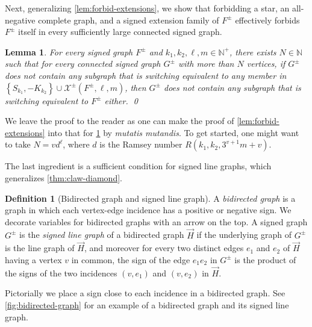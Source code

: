 \documentclass[11pt]{article}
\newtheorem{lemma}[theorem]{Lemma}
\theoremstyle{definition}
\newtheorem{definition}[theorem]{Definition}
\theoremstyle{remark}
\newcommand{\sset}[1]{\left\{{#1}\right\}}
\newcommand{\N}{\mathbb{N}}
\newcommand{\X}{\mathcal{X}}
\begin{document}
Next, generalizing \cref{lem:forbid-extensions}, we show that forbidding a star, an all-negative complete graph, and a signed extension family of $F^\pm$ effectively forbids $F^\pm$ itself in every sufficiently large connected signed graph.

\begin{lemma} \label{lem:forbid-extensions-signed}
    For every signed graph $F^\pm$ and $k_1, k_2, \ell, m \in \N^+$, there exists $N \in \N$ such that for every connected signed graph $G^\pm$ with more than $N$ vertices, if $G^\pm$ does not contain any subgraph that is switching equivalent to any member in $\sset{S_{k_1}, -K_{k_2}} \cup \X^\pm(F^\pm, \ell, m)$, then $G^\pm$ does not contain any subgraph that is switching equivalent to $F^\pm$ either. \qed
\end{lemma}

We leave the proof to the reader as one can make the proof of \cref{lem:forbid-extensions} into that for \cref{lem:forbid-extensions-signed} by \emph{mutatis mutandis}. To get started, one might want to take $N = vd^\ell$, where $d$ is the Ramsey number $R(k_1, k_2, 3^{v+1} m + v)$.

The last ingredient is a sufficient condition for signed line graphs, which generalizes \cref{thm:claw-diamond}.

\begin{definition}[Bidirected graph and signed line graph] \label{def:signed-line-graph}
    A \emph{bidirected graph} is a graph in which each vertex-edge incidence has a positive or negative sign. We decorate variables for bidirected graphs with an arrow on the top. A signed graph $G^\pm$ is the \emph{signed line graph} of a bidirected graph $\vec{H}$ if the underlying graph of $G^\pm$ is the line graph of $\vec{H}$, and moreover for every two distinct edges $e_1$ and $e_2$ of $\vec{H}$ having a vertex $v$ in common, the sign of the edge $e_1 e_2$ in $G^\pm$ is the product of the signs of the two incidences $(v, e_1)$ and $(v, e_2)$ in $\vec{H}$.
\end{definition}

Pictorially we place a sign close to each incidence in a bidirected graph. See \cref{fig:bidirected-graph} for an example of a bidirected graph and its signed line graph.
\end{document}
